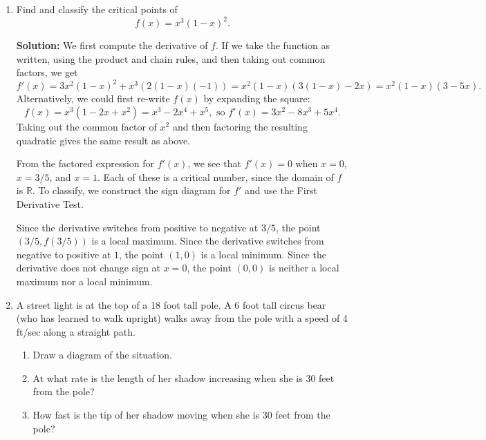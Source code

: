 \documentclass[12pt]{article}
\newcommand{\points}[1]{\marginpar{\hspace{24pt}[#1]}}
\newcommand{\R}{\mathbb{R}}
\begin{document}
 \begin{enumerate}
 \item  Find and classify the critical points of \points{5}
 \[
 f(x) = x^3(1-x)^2.
 \]
 
 \medskip
 
 \textbf{Solution:} We first compute the derivative of $f$. If we take the function as written, using the product and chain rules, and then taking out common factors, we get
 \[
 f'(x) = 3x^2(1-x)^2+x^3(2(1-x)(-1))=x^2(1-x)(3(1-x)-2x) = x^2(1-x)(3-5x).
 \]
 Alternatively, we could first re-write $f(x)$ by expanding the square:
 \[
 f(x) = x^3(1-2x+x^2) = x^3-2x^4+x^5, \text{ so } f'(x) = 3x^2-8x^3+5x^4.
 \]
 Taking out the common factor of $x^2$ and then factoring the resulting quadratic gives the same result as above.
 
 From the factored expression for $f'(x)$, we see that $f'(x)=0$ when $x=0$, $x=3/5$, and $x=1$. Each of these is a critical number, since the domain of $f$ is $\R$. To classify, we construct the sign diagram for $f'$ and use the First Derivative Test.
 \begin{center}
\end{center}
 Since the derivative switches from positive to negative at $3/5$, the point $(3/5, f(3/5))$ is a local maximum. Since the derivative switches from negative to positive at $1$, the point $(1,0)$ is a local minimum. Since the derivative does not change sign at $x=0$, the point $(0,0)$ is neither a local maximum nor a local minimum.
 
 \newpage
 
 \item A street light is at the top of a 18 foot tall pole. A 6 foot tall circus bear (who has learned to walk upright) walks away from the pole with a speed of 4 ft/sec along a straight path. 
\begin{enumerate}
\item Draw a diagram of the situation. \points{1}
\item At what rate is the length of her shadow increasing when she is 30 feet from the pole?\points{2}
\item How fast is the tip of her shadow moving when she is 30 feet from the pole? \points{2}


\end{enumerate}
\end{enumerate}
\end{document}
